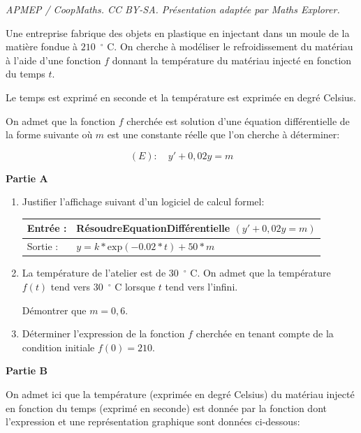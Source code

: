 \documentclass[10pt]{article}
\begin{document}
\noindent\textit{APMEP / CoopMaths. CC BY-SA. Présentation adaptée par Maths Explorer.}\par\medskip
\medskip

Une entreprise fabrique des objets en plastique en injectant dans un moule de la matière fondue à $210$~\ensuremath{^\circ} C. On cherche à modéliser le refroidissement du matériau à l'aide d'une fonction $f$ donnant la température du matériau injecté en fonction du temps $t$.

Le temps est exprimé en seconde et la température est exprimée en degré Celsius.

On admet que la fonction $f$ cherchée est solution d'une équation différentielle de la forme suivante où $m$ est une constante réelle que l'on cherche à déterminer:

\[(E) : \quad  y'  +0,02y = m\]


\textbf{Partie A}

\medskip

\begin{enumerate}
\item Justifier l'affichage suivant d'un logiciel de calcul formel:

\begin{center}
\begin{tabularx}{\linewidth}{|l|X|}\hline
Entrée :& RésoudreEquationDifférentielle $(y' + 0,02y = m)$\\ \hline
Sortie :& \fbox{$\to$}\: $y = k *\text{exp}(-0.02 * t) + 50 * m$\\ \hline
\end{tabularx}
\end{center}

\item  La température de l'atelier est de 30~\ensuremath{^\circ} C. On admet que la température $f(t)$ tend vers 30~\ensuremath{^\circ} C lorsque $t$ tend vers l'infini.

Démontrer que $m = 0,6$.
\item Déterminer l'expression de la fonction $f$ cherchée en tenant compte de la condition
initiale $f(0) = 210.$
\end{enumerate}

\medskip

\textbf{Partie B}

\medskip

On admet ici que la température (exprimée en degré Celsius) du matériau injecté en fonction du temps (exprimé en seconde) est donnée par la fonction dont l'expression et une représentation graphique sont données ci-dessous:
\end{document}
